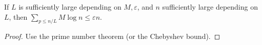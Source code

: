 \begin{sublemma}
\label{bound-score-2}
\leanok
If $L$ is sufficiently large depending on $M, \varepsilon$, and $n$
  sufficiently large depending on $L$, then $\sum_{p \leq n/L} M \log n  \leq \varepsilon n$.
\end{sublemma}
\begin{proof}
\leanok
Use the prime number theorem (or the Chebyshev bound).
\end{proof}
